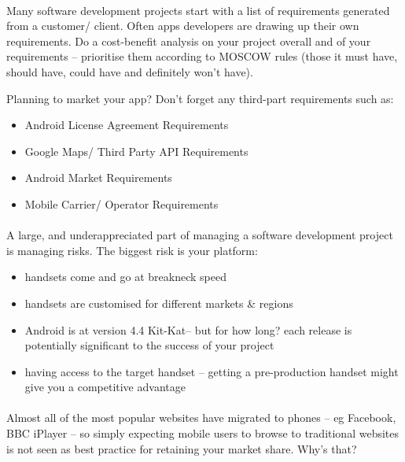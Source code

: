 \documentclass[12pt, a4paper, twoside]{book}
\begin{document}
\paragraph{} Many software development projects start with a list of requirements generated from a customer/ client.  Often apps developers are drawing up their own requirements. Do a cost-benefit analysis on your project overall and of your requirements – prioritise them according to MOSCOW rules (those it must have, should have, could have and definitely won't have).

\begin{framed}
Planning to market your app? Don't forget any third-part requirements such as:
\begin{itemize}
\item Android License Agreement Requirements
\item Google Maps/ Third Party API Requirements
\item Android Market Requirements
\item Mobile Carrier/ Operator Requirements
\end{itemize}
\end{framed}

\paragraph{} A large, and underappreciated part of managing a software development project is managing risks. The biggest risk is your platform:
\begin{itemize}
\item handsets come and go at breakneck speed
\item handsets are customised for different markets \& regions
\item Android is at version 4.4 Kit-Kat– but for how long? each release is potentially significant to the success of your project
\item having access to the target handset – getting a pre-production handset might give you a competitive advantage
\end{itemize}

\paragraph{} Almost all of the most popular websites have migrated to phones – eg Facebook, BBC iPlayer – so simply expecting mobile users to browse to traditional websites is not seen as best practice for retaining your market share. Why's that?
\end{document}
